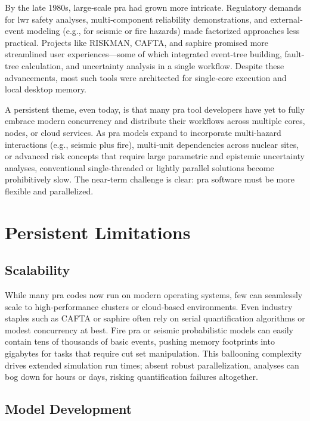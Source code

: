 By the late 1980s, large‐scale \acrshort{pra} had grown more intricate. Regulatory demands for \acrshort{lwr} safety analyses, multi‐component reliability demonstrations, and external‐event modeling (e.g., for seismic or fire hazards) made factorized approaches less practical. Projects like RISKMAN, CAFTA, and \acrshort{saphire} promised more streamlined user experiences—some of which integrated event-tree building, fault-tree calculation, and uncertainty analysis in a single workflow. Despite these advancements, most such tools were architected for single‐core execution and local desktop memory.

A persistent theme, even today, is that many \acrshort{pra} tool developers have yet to fully embrace modern concurrency and distribute their workflows across multiple cores, nodes, or cloud services. As \acrshort{pra} models expand to incorporate multi-hazard interactions (e.g., seismic plus fire), multi‐unit dependencies across nuclear sites, or advanced risk concepts that require large parametric and epistemic uncertainty analyses, conventional single‐threaded or lightly parallel solutions become prohibitively slow. The near‐term challenge is clear: \acrshort{pra} software must be more flexible and parallelized.


\section{Persistent Limitations}

\subsection{Scalability}

While many \acrshort{pra} codes now run on modern operating systems, few can seamlessly scale to high‐performance clusters or cloud‐based environments. Even industry staples such as CAFTA or \acrshort{saphire} often rely on serial quantification algorithms or modest concurrency at best. Fire \acrshort{pra} or seismic probabilistic models can easily contain tens of thousands of basic events, pushing memory footprints into gigabytes for tasks that require cut set manipulation. This ballooning complexity drives extended simulation run times; absent robust parallelization, analyses can bog down for hours or days, risking quantification failures altogether.

\subsection{Model Development}

